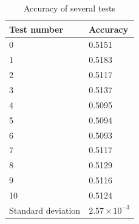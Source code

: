 \documentclass[a4paper]{report}
\begin{document}
		
		\begin{table}
			\centering
				\begin{tabular}{l|l}
				\hline
				Test number & Accuracy \\
				\hline \hline
				0 & 0.5151 \\
				1 & 0.5183 \\
				2 & 0.5117 \\
				3 & 0.5137 \\
				4 & 0.5095 \\
				5 & 0.5094 \\
				6 & 0.5093 \\
				7 & 0.5117 \\
				8 & 0.5129 \\
				9 & 0.5116 \\
				10 & 0.5124 \\
				\hline
				Standard deviation & $2.57 \times 10^{-3}$ \\
				\hline
				\end{tabular}
			\caption{\label{tab:VarZeropertAcc}Accuracy of several tests}
		\end{table}
		
\end{document}
